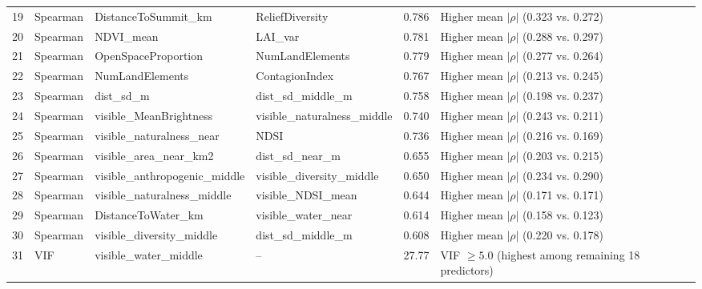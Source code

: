\documentclass[hidelinks, 11pt]{article}
\begin{document}
\begin{longtable}{@{}cp{2.2cm}p{2.6cm}p{2.6cm}cp{6.5cm}@{}}
19 & Spearman & DistanceToSummit\_km & ReliefDiversity & 0.786 & Higher mean $|\rho|$ (0.323 vs. 0.272) \\
20 & Spearman & NDVI\_mean & LAI\_var & 0.781 & Higher mean $|\rho|$ (0.288 vs. 0.297) \\
21 & Spearman & OpenSpaceProportion & NumLandElements & 0.779 & Higher mean $|\rho|$ (0.277 vs. 0.264) \\
22 & Spearman & NumLandElements & ContagionIndex & 0.767 & Higher mean $|\rho|$ (0.213 vs. 0.245) \\
23 & Spearman & dist\_sd\_m & dist\_sd\_middle\_m & 0.758 & Higher mean $|\rho|$ (0.198 vs. 0.237) \\
24 & Spearman & visible\_MeanBrightness & visible\_naturalness\_middle & 0.740 & Higher mean $|\rho|$ (0.243 vs. 0.211) \\
25 & Spearman & visible\_naturalness\_near & NDSI & 0.736 & Higher mean $|\rho|$ (0.216 vs. 0.169) \\
26 & Spearman & visible\_area\_near\_km2 & dist\_sd\_near\_m & 0.655 & Higher mean $|\rho|$ (0.203 vs. 0.215) \\
27 & Spearman & visible\_anthropogenic\_middle & visible\_diversity\_middle & 0.650 & Higher mean $|\rho|$ (0.234 vs. 0.290) \\
28 & Spearman & visible\_naturalness\_middle & visible\_NDSI\_mean & 0.644 & Higher mean $|\rho|$ (0.171 vs. 0.171) \\
29 & Spearman & DistanceToWater\_km & visible\_water\_near & 0.614 & Higher mean $|\rho|$ (0.158 vs. 0.123) \\
30 & Spearman & visible\_diversity\_middle & dist\_sd\_middle\_m & 0.608 & Higher mean $|\rho|$ (0.220 vs. 0.178) \\
31 & VIF & visible\_water\_middle & -- & 27.77 & VIF $\geq 5.0$ (highest among remaining 18 predictors) \\

\end{longtable}

\clearpage

\clearpage


\end{document}
